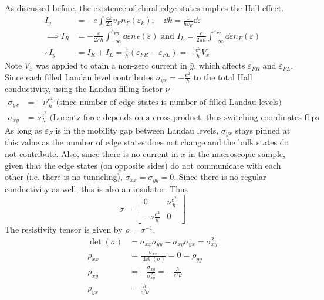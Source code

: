 \documentclass[12pt,a4paper,titlepage]{article}
\newcommand{\trm}[1]{\textrm{#1}} %
\begin{document}
As discussed before, the existence of chiral edge states implies the Hall effect.
\begin{equation}
\begin{aligned}
I_{y}&=-e\int\frac{\dd{k}}{2\pi}v_{F}n_{F}(\varepsilon_{k}),\quad \dd{k}=\frac{1}{\hbar v_{F}}\dd{\varepsilon}\\
\implies I_{R}&=-\frac{e}{2\pi\hbar}\int_{-\infty}^{\varepsilon_{FR}}\dd{\varepsilon}n_{F}(\varepsilon)\trm{ and }I_{L}=\frac{e}{2\pi\hbar}\int_{-\infty}^{\varepsilon_{FL}}\dd{\varepsilon}n_{F}(\varepsilon)\\
\therefore I_{y}&=I_{R}+I_{L}=\frac{e}{h}(\varepsilon_{FR}-\varepsilon_{FL})=-\frac{e^{2}}{\hbar}V_{x}
\end{aligned}
\end{equation}
Note $V_{x}$ was applied to otain a non-zero current in $\hat{y}$, which affects $\varepsilon_{FR}$ and $\varepsilon_{FL}$.\\

Since each filled Landau level contributes $\sigma_{yx}=-\frac{e^{2}}{h}$ to the total Hall conductivity, using the Landau filling factor $\nu$
\begin{equation}
\begin{aligned}
\sigma_{yx}&=-\nu\frac{e^{2}}{h} \trm{ (since number of edge states is number of filled Landau levels)}\\
\sigma_{xy}&=\nu\frac{e^{2}}{h} \trm{ (Lorentz force depends on a cross product, thus switching coordinates flips signs)}
\end{aligned}
\end{equation}
As long as $\varepsilon_{F}$ is in the mobility gap between Landau levels, $\sigma_{yx}$ stays pinned at this value as the number of edge states does not change and the bulk states do not contribute. Also, since there is no current in $x$ in the macroscopic sample, given that the edge states (on opposite sides) do not communicate with each other (i.e. there is no tunneling), $\sigma_{xx}=\sigma_{yy}=0$. Since there is no regular conductivity as well, this is also an insulator. Thus
\begin{equation}
\sigma=\begin{bmatrix}
0 & \nu\frac{e^{2}}{h}\\
-\nu\frac{e^{2}}{h} & 0
\end{bmatrix}
\end{equation}
The resistivity tensor is given by $\rho=\sigma^{-1}$.
\begin{equation}
\begin{aligned}
\det(\sigma)&=\sigma_{xx}\sigma_{yy}-\sigma_{xy}\sigma_{yx}=\sigma_{xy}^{2}\\
\rho_{xx}&=\frac{\sigma_{xx}}{\det(\sigma)}=0=\rho_{yy}\\
\rho_{xy}&=-\frac{\sigma_{xy}}{\sigma_{xy}^{2}}=-\frac{h}{e^{2}\nu}\\
\rho_{yx}&=\frac{h}{e^{2}\nu}
\end{aligned}
\end{equation}
\end{document}
